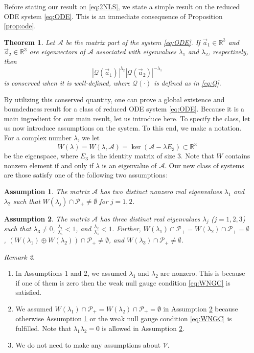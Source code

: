 \documentclass[11pt,a4paper,twosides]{amsart}
\theoremstyle{plain}
\newtheorem{theorem}{Theorem}[section]
\newtheorem{assumption}{Assumption} %
\theoremstyle{remark}
\newtheorem{remark}[theorem]{Remark}
\numberwithin{equation}{section}
\newcommand{\R}{\mathbb{R}}
\theoremstyle{definition}
\newcommand{\1}{{\bf 1}_{\{|x| < |t|\}}}
\begin{document}
Before stating our result on \eqref{eq:2NLS}, we state a
 simple result on the reduced ODE system \eqref{eq:ODE}.
This is an immediate consequence of Proposition \ref{prop:ode}.
\begin{theorem}\label{thm:cons}
Let $\mathscr{A}$ be the matrix part of the system \eqref{eq:ODE}.
If $\vec{a}_1 \in \R^3$ and $\vec{a}_2 \in \R^3$ are eigenvectors of $\mathscr{A}$ associated with eigenvalues $\lambda_1$ and $\lambda_2$, respectively, then
\[
	|\mathcal{Q}(\vec{a}_1)|^{\lambda_2} |\mathcal{Q}(\vec{a}_2)|^{-\lambda_1}
\]
is conserved when it is well-defined, where $\mathcal{Q}(\cdot)$ is defined as in \eqref{eq:Q}.
\end{theorem}

By utilizing this conserved quantity, one can prove a global existence and boundedness result for a class of reduced ODE system \eqref{eq:ODE}.
Because it is a main ingredient for our main result, let us introduce here.
To specify the class,
let us now introduce assumptions on the system.
To this end, we make a notation.
For a complex number $\lambda$,
we let
\[
	W(\lambda) = W(\lambda,\mathscr{A})
	= \ker (\mathscr{A}- \lambda E_3) \subset \R^3
\]
be the eigenspace, where $E_3$ is the identity matrix of size 3. Note that $W$ contains nonzero element if and only if $\lambda$ is an eigenvalue of $\mathscr{A}$. 
Our new class of systems are those satisfy one of the following two assumptions:
\begin{assumption}\label{A1}
The matrix $\mathscr{A}$ has two distinct nonzero real
eigenvalues $\lambda_1$ and $\lambda_2$ such that
$W(\lambda_j) \cap \mathcal{P}_+\neq \emptyset$ for $j=1,2$.
\end{assumption}
\begin{assumption}\label{A2}
The matrix $\mathscr{A}$ has three distinct real eigenvalues $\lambda_j$
($j=1,2,3$) such that $\lambda_3\neq0$,
$\frac{\lambda_1}{\lambda_3}<1$, and $\frac{\lambda_2}{\lambda_3}<1$.
Further, 
$W(\lambda_1)\cap \mathcal{P}_+=W(\lambda_2)\cap \mathcal{P}_+=\emptyset$,
$(W(\lambda_1)\oplus W(\lambda_2))\cap \mathcal{P}_+\neq \emptyset$, and $W(\lambda_3) \cap \mathcal{P}_+ \neq \emptyset$.
\end{assumption}
\begin{remark}
\begin{enumerate}
\item 
In Assumptions 1 and 2, 
we assumed $\lambda_1$ and $\lambda_2$ are nonzero. This is because if one of them is zero then the weak null gauge condition \eqref{eq:WNGC} is satisfied.
\item
We assumed $W(\lambda_1)\cap \mathcal{P}_+=W(\lambda_2)\cap \mathcal{P}_+=\emptyset$ in Assumption \ref{A2}
because otherwise Assumption \ref{A1} or %
the weak null gauge condition \eqref{eq:WNGC} is fulfilled.
Note that $\lambda_1\lambda_2=0$ is allowed
in Assumption \ref{A2}.
\item 
We do not need to make any assumptions about $\mathscr{V}$.
\end{enumerate}
\end{remark}
\end{document}
